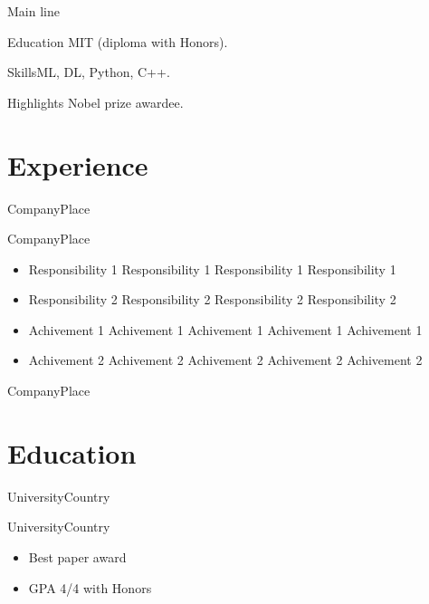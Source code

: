 \documentclass[letterpaper, 10pt, yearbullet]{techcv}
\author{Surname}{Name}{N.}
\begin{document}
\maketitle

\begin{paracol}{2}

\begin{summary}
\item{Main line}
    {\lipsum[66]}

\item{Education}
	{MIT (diploma with Honors).}

\item{Skills}{ML, DL, Python, C++.}

\item{Highlights}
	{Nobel prize awardee.}
\end{summary}


\section{Experience}

\begin{joblist}
	{Company}{Place}
    {\lipsum[66]}

	{Company}{Place}
    {%
	\begin{itemize}
		\item Responsibility 1 Responsibility 1 Responsibility 1 Responsibility 1
		\item Responsibility 2 Responsibility 2 Responsibility 2 Responsibility 2
		\item Achivement 1 Achivement 1 Achivement 1 Achivement 1 Achivement 1
		\item Achivement 2 Achivement 2 Achivement 2 Achivement 2 Achivement 2
	\end{itemize}%
	}

	{Company}{Place}
    {\lipsum[75]}
\end{joblist}


\section{Education}

\begin{joblist}
    {University}{Country}{}

    {University}{Country}
    {\begin{itemize}
            \item Best paper award
            \item GPA 4/4 with Honors
        \end{itemize}}


\end{joblist}
\end{paracol}
\end{document}
